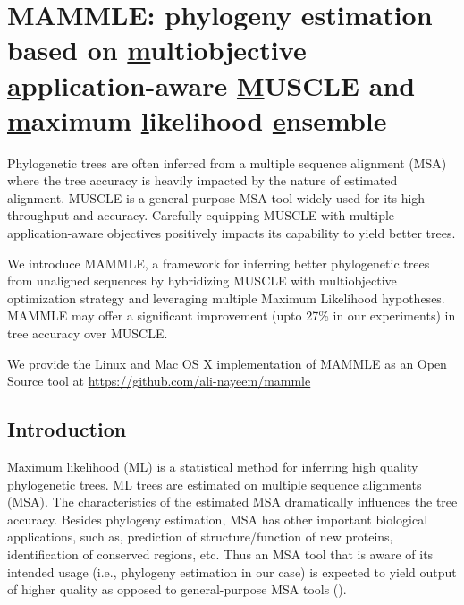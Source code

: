 
\graphicspath{{mammle/}}

\chapter{MAMMLE: phylogeny estimation based on \underline{m}ultiobjective \underline{a}pplication-aware \underline{M}USCLE and \underline{m}aximum \underline{l}ikelihood \underline{e}nsemble}

Phylogenetic trees are often inferred from a multiple sequence alignment (MSA) where the tree accuracy is heavily impacted by the nature of estimated alignment. MUSCLE is a general-purpose MSA tool widely used for its high throughput and accuracy. Carefully equipping MUSCLE with multiple application-aware objectives positively impacts its capability to yield better trees.

We introduce MAMMLE, a framework for inferring better phylogenetic trees from unaligned sequences by hybridizing MUSCLE with multiobjective optimization strategy and leveraging multiple Maximum Likelihood hypotheses. MAMMLE may offer a significant improvement (upto 27\% in our experiments) in tree accuracy over MUSCLE.

We provide the Linux and Mac OS X implementation of MAMMLE as an Open Source tool at \url{https://github.com/ali-nayeem/mammle}

\section{Introduction}
Maximum likelihood (ML) is a statistical method for inferring high quality phylogenetic trees. ML trees are estimated on multiple sequence alignments (MSA). The characteristics of the estimated MSA dramatically influences the tree accuracy. Besides phylogeny estimation, MSA has other important biological applications, such as, prediction of structure/function of new proteins, identification of conserved regions, etc. Thus an MSA tool that is aware of its intended usage (i.e., phylogeny estimation in our case) is expected to yield output of higher quality as opposed to general-purpose MSA tools (\cite{nayeem2020multiobjective}).  

